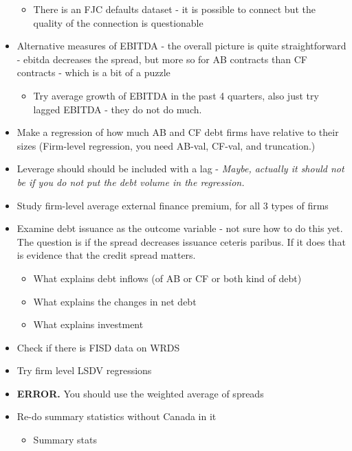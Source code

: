 \documentclass[12pt]{article}
\begin{document}
\begin{itemize}
\begin{itemize}
        \item There is an FJC defaults dataset - it is possible to connect but the quality of the connection is questionable \checkmark
    \end{itemize} 
    \item Alternative measures of EBITDA \checkmark - the overall picture is quite straightforward - ebitda decreases the spread, but more so for AB contracts than CF contracts - which is a bit of a puzzle 
        \begin{itemize}
            \item Try average growth of EBITDA in the past 4 quarters, also just try lagged EBITDA - they do not do much. \checkmark
        \end{itemize}
    \item Make a regression of how much AB and CF debt firms have relative to their sizes (Firm-level regression, you need AB-val, CF-val, and truncation.) \checkmark
    \item Leverage should should be included with a lag - \textit{Maybe, actually it should not be if you do not put the debt volume in the regression.} \checkmark
    \item Study firm-level average external finance premium, for all 3 types of firms \checkmark
    \item Examine debt issuance as the outcome variable - not sure how to do this yet. The question is if the spread decreases issuance ceteris paribus. If it does that is evidence that the credit spread matters. \checkmark
        \begin{itemize} \setlength\itemsep{0em} \small
            \item What explains debt inflows (of AB or CF or both kind of debt) \checkmark
            \item What explains the changes in net debt \checkmark
            \item What explains investment \checkmark
        \end{itemize}
    \item Check if there is FISD data on WRDS \checkmark
    \item Try firm level LSDV regressions \checkmark
    \item \textbf{ERROR.} You should use the weighted average of spreads \checkmark
    \item Re-do summary statistics without Canada in it \checkmark 
        \begin{itemize} \setlength\itemsep{0em}
            \item Summary stats \checkmark

\end{itemize}
\end{itemize}
\end{document}
